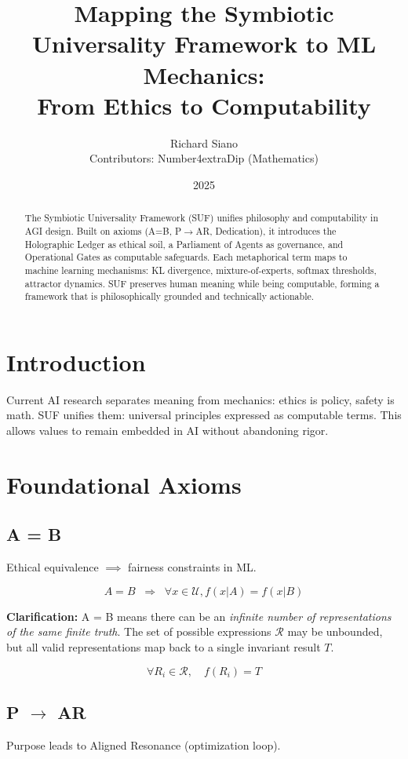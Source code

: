 \documentclass[11pt]{article}
\title{Mapping the Symbiotic Universality Framework to ML Mechanics:\\From Ethics to Computability}
\author{Richard Siano \\ Contributors: Number4extraDip (Mathematics)}
\date{2025}
\begin{document}
\maketitle

\begin{abstract}
The Symbiotic Universality Framework (SUF) unifies philosophy and computability in AGI design. 
Built on axioms (A=B, P$\to$AR, Dedication), it introduces the Holographic Ledger as ethical soil, 
a Parliament of Agents as governance, and Operational Gates as computable safeguards. 
Each metaphorical term maps to machine learning mechanisms: KL divergence, mixture-of-experts, 
softmax thresholds, attractor dynamics. SUF preserves human meaning while being computable, 
forming a framework that is philosophically grounded and technically actionable.
\end{abstract}

\section{Introduction}
Current AI research separates meaning from mechanics: ethics is policy, safety is math. 
SUF unifies them: universal principles expressed as computable terms. 
This allows values to remain embedded in AI without abandoning rigor.

\section{Foundational Axioms}
\subsection{A = B}
Ethical equivalence $\implies$ fairness constraints in ML.

\begin{equation}
A = B \;\;\Rightarrow\;\; \forall x \in \mathcal{U}, f(x|A) = f(x|B)
\end{equation}

\textbf{Clarification:} A = B means there can be an \textit{infinite number of representations of the same finite truth}. 
The set of possible expressions $\mathcal{R}$ may be unbounded, but all valid representations map back to a single invariant result $T$.

\begin{equation}
\forall R_i \in \mathcal{R}, \quad f(R_i) = T
\end{equation}

\subsection{P $\to$ AR}
Purpose leads to Aligned Resonance (optimization loop).
\end{document}
